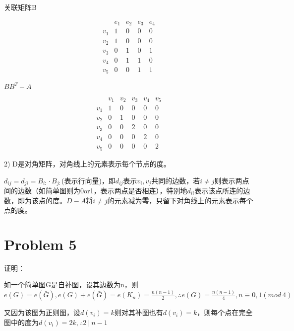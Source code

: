 \documentclass{article}
\begin{document}
\begin{center}
    关联矩阵B
\end{center}
\begin{equation}
    \begin{array}{c|c|c|c|c} 
        & e_{1} & e_{2} & e_{3} & e_{4}\\
        \hline v_{1} & 1 & 0 & 0 & 0  \\
        \hline v_{2} & 1 & 0 & 0 & 0  \\
        \hline v_{3} & 0 & 1 & 0 & 1  \\
        \hline v_{4} & 0 & 1 & 1 & 0  \\
        \hline v_{5} & 0 & 0 & 1 & 1 
        \end{array}
\end{equation}

\begin{center}
    $BB^T-A$
\end{center}
\begin{equation}
    \begin{array}{c|c|c|c|c|c} 
        & v_{1} & v_{2} & v_{3} & v_{4} & v_{5} \\
        \hline v_{1} & 1 & 0 & 0 & 0 & 0 \\
        \hline v_{2} & 0 & 1 & 0 & 0 & 0 \\
        \hline v_{3} & 0 & 0 & 2 & 0 & 0 \\
        \hline v_{4} & 0 & 0 & 0 & 2 & 0 \\
        \hline v_{5} & 0 & 0 & 0 & 0 & 2
    \end{array}
\end{equation}

2)
D是对角矩阵，对角线上的元素表示每个节点的度。

$d_{ij}=d_{ji}=B_{i:}\cdot B_{j:}$(表示行向量)，即$d_{ij}$表示$v_i,v_j$共同的边数，若$i\neq j$则表示两点间的边数（如简单图则为0or1，表示两点是否相连），特别地$d_{ii}$表示该点所连的边数，即为该点的度。$D-A$将$i\neq j$的元素减为零，只留下对角线上的元素表示每个点的度。
\section*{Problem 5}
证明：

如一个简单图G是自补图，设其边数为n，则$e(G)=e(\bar{G}),e(G)+e(\bar{G})=e(K_n)=\frac{n(n-1)}{2},\therefore e(G)=\frac{n(n-1)}{4},n\equiv 0,1(mod~ 4)$

又因为该图为正则图，设$d(v_i)=k$则对其补图也有$d(v_i)=k$，则每个点在完全图中的度为$d(v_i)=2k,\therefore 2 ~|~ n-1$
\end{document}

